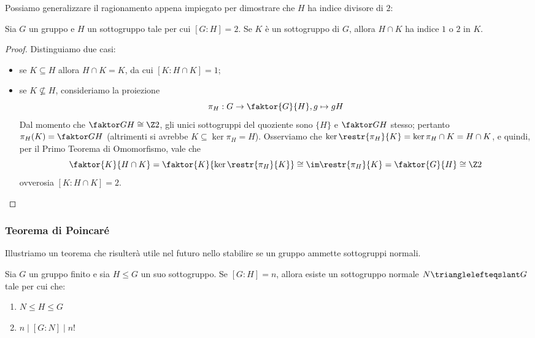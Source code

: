 \documentclass[11pt]{scrartcl}
\begin{document}
	Possiamo generalizzare il ragionamento appena impiegato per dimostrare
	che $H$ ha indice divisore di $2$:
	
	\begin{proposition}
		\label{prop1.49}
		Sia $G$ un gruppo e $H$ un sottogruppo tale per cui $[G:H] = 2$. Se
		$K$ è un sottogruppo di $G$, allora $H\cap K$ ha indice $1$ o $2$ in $K$.
	\end{proposition}
	
	\begin{proof}
		Distinguiamo due casi:
		\begin{itemize}
			\item se $K \subseteq H$ allora $H \cap K = K$, da cui $[K:H\cap K] = 1$;
			\item se $K \nsubseteq H$, consideriamo la proiezione 
			\[
			\pi_H: G \to \faktor{G}{H}, g \mapsto gH
			\]
			Dal momento che $\faktor G H \cong \Z2$, gli unici sottogruppi 
			del quoziente sono $\{H\}$ e $\faktor G H$ stesso; pertanto 
			$\pi_H(K) = \faktor G H$ (altrimenti si avrebbe $K \subseteq \ker \pi_H = H$). Osserviamo che $\ker \restr{\pi_{H}}{K}
			= \ker \pi_H \cap K = H \cap K$, e quindi, per il Primo Teorema di Omomorfismo,
			vale che 
			\[ \faktor{K}{H\cap K} = \faktor{K}{\ker \restr{\pi_{H}}{K}} \cong \im \restr{\pi_{H}}{K} = \faktor{G}{H} \cong \Z2 \]
			ovverosia $[K:H\cap K] = 2$.
		\end{itemize}
	\end{proof}
	
	\subsubsection{Teorema di Poincaré}
	
	Illustriamo un teorema che risulterà utile nel futuro nello stabilire se
	un gruppo ammette sottogruppi normali.
	
	\begin{theorem}
		\label{teorema1.50}
		Sia $G$ un gruppo finito e sia $H \leqslant G$ un suo sottogruppo. 
		Se $[G:H] = n$, allora esiste un sottogruppo normale $N \trianglelefteqslant G$ 
		tale per cui che:
		\begin{enumerate}[(1)]
			\item $N \leqslant H \leqslant G$
			\item $n \mid [G:N] \mid n!$
		\end{enumerate}
	\end{theorem}
	
\end{document}

